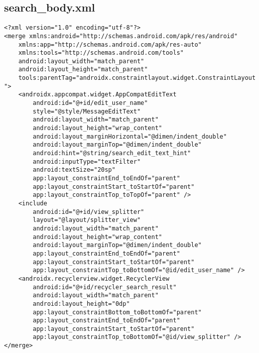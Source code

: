 \documentclass[listing]{espd}
\begin{document}
\subsection{search\_body.xml}
\begin{verbatim}
<?xml version="1.0" encoding="utf-8"?>
<merge xmlns:android="http://schemas.android.com/apk/res/android"
    xmlns:app="http://schemas.android.com/apk/res-auto"
    xmlns:tools="http://schemas.android.com/tools"
    android:layout_width="match_parent"
    android:layout_height="match_parent"
    tools:parentTag="androidx.constraintlayout.widget.ConstraintLayout
">
    <androidx.appcompat.widget.AppCompatEditText
        android:id="@+id/edit_user_name"
        style="@style/MessageEditText"
        android:layout_width="match_parent"
        android:layout_height="wrap_content"
        android:layout_marginHorizontal="@dimen/indent_double"
        android:layout_marginTop="@dimen/indent_double"
        android:hint="@string/search_edit_text_hint"
        android:inputType="textFilter"
        android:textSize="20sp"
        app:layout_constraintEnd_toEndOf="parent"
        app:layout_constraintStart_toStartOf="parent"
        app:layout_constraintTop_toTopOf="parent" />
    <include
        android:id="@+id/view_splitter"
        layout="@layout/splitter_view"
        android:layout_width="match_parent"
        android:layout_height="wrap_content"
        android:layout_marginTop="@dimen/indent_double"
        app:layout_constraintEnd_toEndOf="parent"
        app:layout_constraintStart_toStartOf="parent"
        app:layout_constraintTop_toBottomOf="@id/edit_user_name" />
    <androidx.recyclerview.widget.RecyclerView
        android:id="@+id/recycler_search_result"
        android:layout_width="match_parent"
        android:layout_height="0dp"
        app:layout_constraintBottom_toBottomOf="parent"
        app:layout_constraintEnd_toEndOf="parent"
        app:layout_constraintStart_toStartOf="parent"
        app:layout_constraintTop_toBottomOf="@id/view_splitter" />
</merge>
\end{verbatim}
\end{document}
